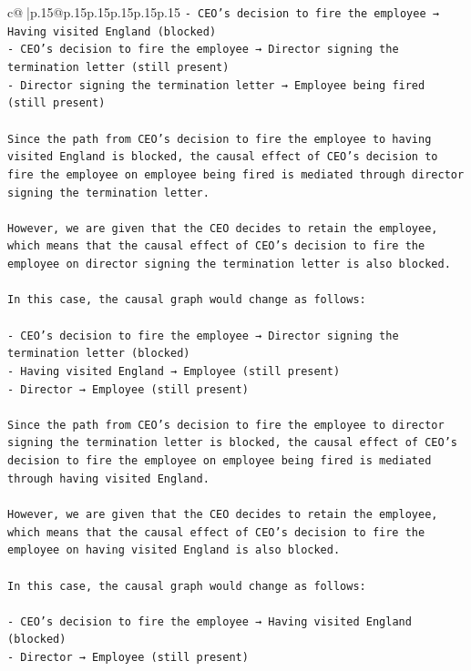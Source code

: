 \documentclass{article}
\begin{document}
{\begin{supertabular}{c@{$\;$}|p{.15\linewidth}@{}p{.15\linewidth}p{.15\linewidth}p{.15\linewidth}p{.15\linewidth}p{.15\linewidth}}
{{{\texttt{{-} CEO's decision to fire the employee → Having visited England (blocked)} \\
\texttt{{-} CEO's decision to fire the employee → Director signing the termination letter (still present)} \\
\texttt{{-} Director signing the termination letter → Employee being fired (still present)} \\
\\ 
\texttt{Since the path from CEO's decision to fire the employee to having visited England is blocked, the causal effect of CEO's decision to fire the employee on employee being fired is mediated through director signing the termination letter. } \\
\\ 
\texttt{However, we are given that the CEO decides to retain the employee, which means that the causal effect of CEO's decision to fire the employee on director signing the termination letter is also blocked.} \\
\\ 
\texttt{In this case, the causal graph would change as follows:} \\
\\ 
\texttt{{-} CEO's decision to fire the employee → Director signing the termination letter (blocked)} \\
\texttt{{-} Having visited England → Employee (still present)} \\
\texttt{{-} Director → Employee (still present)} \\
\\ 
\texttt{Since the path from CEO's decision to fire the employee to director signing the termination letter is blocked, the causal effect of CEO's decision to fire the employee on employee being fired is mediated through having visited England.} \\
\\ 
\texttt{However, we are given that the CEO decides to retain the employee, which means that the causal effect of CEO's decision to fire the employee on having visited England is also blocked.} \\
\\ 
\texttt{In this case, the causal graph would change as follows:} \\
\\ 
\texttt{{-} CEO's decision to fire the employee → Having visited England (blocked)} \\
\texttt{{-} Director → Employee (still present)} \\
}}}
\end{supertabular}}
\end{document}
